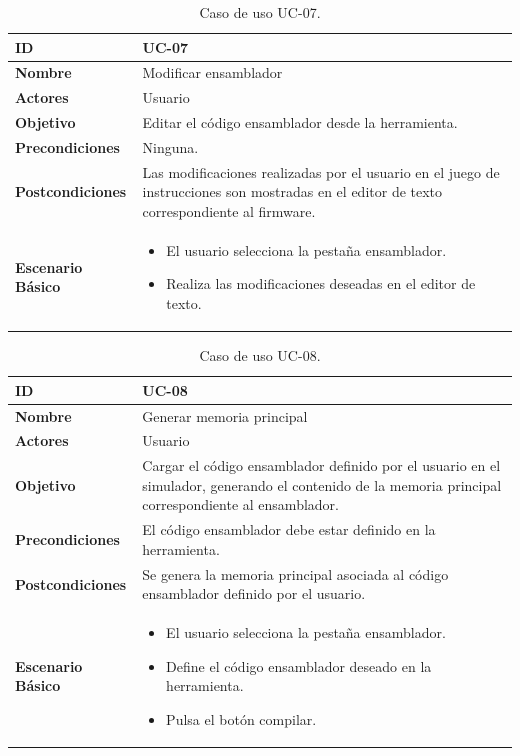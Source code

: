 \begin{center}
\begin{table}[htbp]
\centering
\caption{Caso de uso UC-07.}
\begin{tabular}{@{}p{2.5cm} p{9cm}@{}} 
\toprule
\textbf{ID}	& UC-07  \\
\midrule
\textbf{Nombre} 		& Modificar ensamblador   \\
\midrule
\textbf{Actores} 		&	Usuario  \\
\midrule
\textbf{Objetivo} 	&	Editar el código ensamblador desde la herramienta. 	 \\
\midrule
\textbf{Precondiciones}	&	Ninguna.   \\
\midrule
\textbf{Postcondiciones} 	& Las modificaciones realizadas por el usuario en el juego de instrucciones son mostradas en el editor de texto correspondiente al firmware.   \\
\midrule
\textbf{Escenario Básico} 	&  \begin{itemize}
\item El usuario selecciona la pestaña ensamblador.
\item Realiza las modificaciones deseadas en el editor de texto.
\end{itemize} \\
\bottomrule
\end{tabular}
\label{tab:uc07}
\end{table}
\end{center}

\begin{center}
\begin{table}[htbp]
\centering
\caption{Caso de uso UC-08.}
\begin{tabular}{@{}p{2.5cm} p{9cm}@{}} 
\toprule
\textbf{ID}	& UC-08  \\
\midrule
\textbf{Nombre} 		& Generar memoria principal   \\
\midrule
\textbf{Actores} 		&	Usuario  \\
\midrule
\textbf{Objetivo} 	&	Cargar el código ensamblador definido por el usuario en el simulador, generando el contenido de la memoria principal correspondiente al ensamblador. 	 \\
\midrule
\textbf{Precondiciones}	&	El código ensamblador debe estar definido en la herramienta.  \\
\midrule
\textbf{Postcondiciones} 	& Se genera la memoria principal asociada al código ensamblador definido por el usuario.   \\
\midrule
\textbf{Escenario Básico} 	&  \begin{itemize}
\item El usuario selecciona la pestaña ensamblador.
\item Define el código ensamblador deseado en la herramienta.
\item Pulsa el botón compilar.
\end{itemize} \\
\bottomrule
\end{tabular}
\label{tab:uc08}
\end{table}
\end{center}

